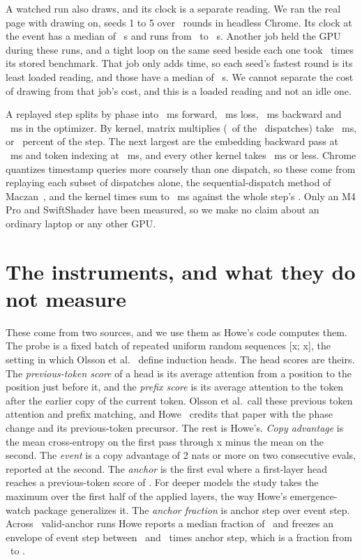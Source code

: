 \documentclass[10pt]{article}
\begin{document}
A watched run also draws, and its clock is a separate reading. We ran the real page with drawing on, seeds 1 to 5 over \nWatchedRounds\ rounds in headless Chrome. Its clock at the event has a median of \nWatchedMedian\ s and runs from \nWatchedLow\ to \nWatchedHigh\ s. Another job held the GPU during these runs, and a tight loop on the same seed beside each one took \nWatchedLoad\ times its stored benchmark. That job only adds time, so each seed's fastest round is its least loaded reading, and those have a median of \nWatchedLeast\ s. We cannot separate the cost of drawing from that job's cost, and this is a loaded reading and not an idle one.

A replayed step splits by phase into \nPhaseFwd\ ms forward, \nPhaseLoss\ ms loss, \nPhaseBwd\ ms backward and \nPhaseOpt\ ms in the optimizer. By kernel, matrix multiplies (\nGemmDispatches\ of the \nDispatches\ dispatches) take \nGemmMs\ ms, or \nGemmShare\ percent of the step. The next largest are the embedding backward pass at \nEmbedBwdMs\ ms and token indexing at \nTokenIndexMs\ ms, and every other kernel takes \nLnFwdMs\ ms or less. Chrome quantizes timestamp queries more coarsely than one dispatch, so these come from replaying each subset of dispatches alone, the sequential-dispatch method of Maczan~\cite{maczan}, and the kernel times sum to \nKernelSum\ ms against the whole step's \nStepMs. Only an M4 Pro and SwiftShader have been measured, so we make no claim about an ordinary laptop or any other GPU.

\section{The instruments, and what they do not measure}
\label{sec:instruments}

These come from two sources, and we use them as Howe's code computes them. The probe is a fixed batch of repeated uniform random sequences [x; x], the setting in which Olsson et al.~\cite{olsson} define induction heads. The head scores are theirs. The \emph{previous-token score} of a head is its average attention from a position to the position just before it, and the \emph{prefix score} is its average attention to the token after the earlier copy of the current token. Olsson et al.\ call these previous token attention and prefix matching, and Howe~\cite{howe} credits that paper with the phase change and its previous-token precursor. The rest is Howe's. \emph{Copy advantage} is the mean cross-entropy on the first pass through x minus the mean on the second. The \emph{event} is a copy advantage of 2 nats or more on two consecutive evals, reported at the second. The \emph{anchor} is the first eval where a first-layer head reaches a previous-token score of \nAnchorThreshold. For deeper models the study takes the maximum over the first half of the applied layers, the way Howe's emergence-watch package generalizes it. The \emph{anchor fraction} is anchor step over event step. Across \nLawRuns\ valid-anchor runs Howe reports a median fraction of \nLawMedian\ and freezes an envelope of event step between \nEnvRatioLow\ and \nEnvRatioHigh\ times anchor step, which is a fraction from \nEnvLow\ to \nEnvHigh.
\end{document}
